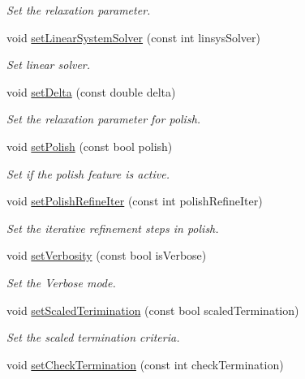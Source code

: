 \begin{DoxyCompactItemize}
\begin{DoxyCompactList}\small\item\em Set the relaxation parameter. \end{DoxyCompactList}\item 
void \hyperlink{classOsqpEigen_1_1Settings_a42e2f3d0fcf93c0a22ba2bb30599c1d3}{set\+Linear\+System\+Solver} (const int linsys\+Solver)
\begin{DoxyCompactList}\small\item\em Set linear solver. \end{DoxyCompactList}\item 
void \hyperlink{classOsqpEigen_1_1Settings_a7a3e8d416f71d7fc572482d24a9a8ba2}{set\+Delta} (const double delta)
\begin{DoxyCompactList}\small\item\em Set the relaxation parameter for polish. \end{DoxyCompactList}\item 
void \hyperlink{classOsqpEigen_1_1Settings_a64c052c5f72065b5319e152095228859}{set\+Polish} (const bool polish)
\begin{DoxyCompactList}\small\item\em Set if the polish feature is active. \end{DoxyCompactList}\item 
void \hyperlink{classOsqpEigen_1_1Settings_aabae74571bfbb2b33ec23b255476fbec}{set\+Polish\+Refine\+Iter} (const int polish\+Refine\+Iter)
\begin{DoxyCompactList}\small\item\em Set the iterative refinement steps in polish. \end{DoxyCompactList}\item 
void \hyperlink{classOsqpEigen_1_1Settings_ac44115458417ef2257bc5c49634b0749}{set\+Verbosity} (const bool is\+Verbose)
\begin{DoxyCompactList}\small\item\em Set the Verbose mode. \end{DoxyCompactList}\item 
void \hyperlink{classOsqpEigen_1_1Settings_ab7d836e9f75480452c7e353e64608a31}{set\+Scaled\+Terimination} (const bool scaled\+Termination)
\begin{DoxyCompactList}\small\item\em Set the scaled termination criteria. \end{DoxyCompactList}\item 
void \hyperlink{classOsqpEigen_1_1Settings_aebc0ad14de70c7c68c09135929dd7a75}{set\+Check\+Termination} (const int check\+Termination)

\end{DoxyCompactItemize}
